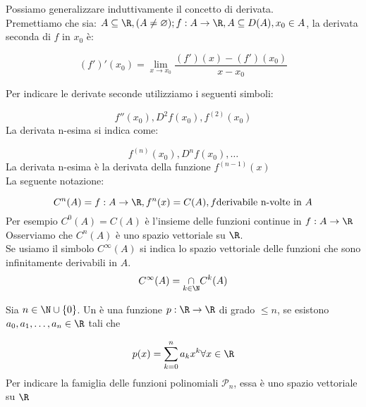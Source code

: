 \documentclass[../analisi.tex]{subfiles}
\begin{document}
\begin{defn}
Possiamo generalizzare induttivamente il concetto di derivata.\\
Premettiamo che sia: $ A \subseteq \R, ( A \neq \varnothing ); f: A \to \R,
A \subseteq D ( A ), x_0 \in A$, la derivata seconda di 
$ f $ in $ x_0 $ è:

\begin{equation}
	( f' )' ( x_0 ) = \lim_{x \to x_0 } \frac{( f' )( x ) - ( f' )( x_0 )  }
	{x-x_0} 
\end{equation}
\end{defn}
Per indicare le derivate seconde utilizziamo i seguenti simboli:

\begin{equation}
	f''( x_0 ), D^2 f(x_0), f^{( 2 ) }( x_0 ) 
\end{equation}
La derivata n-esima si indica come:

\begin{equation}
	f^{( n ) } ( x_0 ), D^n f(x_0), \dots
\end{equation}
La derivata n-esima è la derivata della funzione $ f^{( n-1 ) }( x )  $\\
La seguente notazione:

\begin{equation}
	C^n ( A ) = f: A \to \R, f^n ( x ) = C(A), f \text{derivabile n-volte in }A
\end{equation}
Per esempio $ C^0 ( A ) = C ( A )  $ è l'insieme delle funzioni continue in
$ f: A \to \R $\\
Osserviamo che $ C^n ( A )  $ è uno spazio vettoriale su $ \R $.\\
Se usiamo il simbolo $ C^{\infty} ( A )  $ si indica lo spazio vettoriale delle
funzioni che sono infinitamente derivabili in $ A $.\\

\begin{equation}
	C^\infty ( A ) = \underset{k \in \N}{\cap} C^k ( A ) 
\end{equation}


\begin{defn}
	Sia $ n \in \N \cup \{ 0 \} $.
	Un  è una funzione $ p: \R \to \R $ di grado
	$ \leq n $, se esistono $ a_0, a_1,\dots, a_n \in \R $ tali che

	\begin{equation}
		p ( x ) = \sum^{n}_{k=0} a_k x^k \forall x \in \R
	\end{equation}
	Per indicare la famiglia delle funzioni polinomiali
	$\mathcal{P}_n$, essa è uno spazio vettoriale su $\R$
\end{defn}
\end{document}

